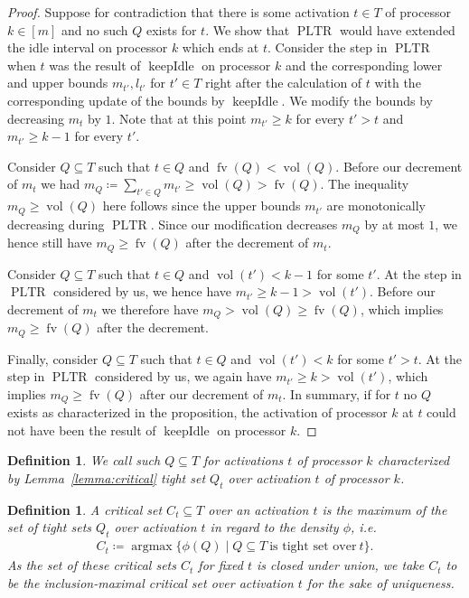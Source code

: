 \documentclass[a4paper]{article}
\DeclareMathOperator{\argmax}{argmax}
\DeclareMathOperator{\PLTR}{PLTR}
\DeclareMathOperator{\fv}{fv}
\DeclareMathOperator{\vol}{vol}
\DeclareMathOperator{\keepidle}{keepIdle}
\newtheorem{definition}[theorem]{Definition}
\begin{document}
\begin{proof}
  Suppose for contradiction that there is some activation $t \in T$ of processor $k \in [m]$ and no such $Q$ exists for $t$.
  We show that $\PLTR$ would have extended the idle interval on processor $k$ which ends at $t$.
  Consider the step in $\PLTR$ when $t$ was the result of $\keepidle$ on processor $k$ and the corresponding lower and upper bounds $m_{t'}, l_{t'}$ for $t' \in T$ right after the calculation of $t$ with the corresponding update of the bounds by $\keepidle$.
  We modify the bounds by decreasing $m_t$ by $1$.
  Note that at this point $m_{t'} \geq k$ for every $t' > t$ and $m_{t'} \geq k - 1$ for every $t'$.

  Consider $Q \subseteq T$ such that $t \in Q$ and $\fv(Q) < \vol(Q)$.
  Before our decrement of $m_t$ we had $m_Q \coloneqq \sum_{t' \in Q} m_{t'} \geq \vol(Q) > \fv(Q)$.
  The inequality $m_Q \geq \vol(Q)$ here follows since the upper bounds $m_{t'}$ are monotonically decreasing during $\PLTR$.
  Since our modification decreases $m_Q$ by at most $1$, we hence still have $m_Q \geq \fv(Q)$ after the decrement of $m_t$.

  Consider $Q \subseteq T$ such that $t \in Q$ and $\vol(t') < k - 1$ for some $t'$.
  At the step in $\PLTR$ considered by us, we hence have $m_{t'} \geq k - 1 > \vol(t')$.
  Before our decrement of $m_t$ we therefore have $m_Q > \vol(Q) \geq \fv(Q)$, which implies $m_Q \geq \fv(Q)$ after the decrement.

  Finally, consider $Q \subseteq T$ such that $t \in Q$ and $\vol(t') < k$ for some $t' > t$.
  At the step in $\PLTR$ considered by us, we again have $m_{t'} \geq k > \vol(t')$, which implies $m_Q \geq \fv(Q)$ after our decrement of $m_t$.
  In summary, if for $t$ no $Q$ exists as characterized in the proposition, the activation of processor $k$ at $t$ could not have been the result of $\keepidle$ on processor $k$.
\end{proof}

\begin{definition}
  We call such $Q \subseteq T$ for activations $t$ of processor $k$ characterized by Lemma~\ref{lemma:critical} \emph{tight set $Q_t$ over activation $t$ of processor $k$}.
\end{definition}

\begin{definition}
  A \emph{critical set $C_t \subseteq T$ over an activation $t$} is the maximum of the set of tight sets $Q_t$ over activation $t$ in regard to the density $\phi$, i.e.
  \begin{align}
    C_t \coloneqq \argmax \{ \phi(Q) \mid Q \subseteq T~\text{is tight set over}~t \} \text{.}
  \end{align}
  As the set of these critical sets $C_t$ for fixed $t$ is closed under union, we take $C_t$ to be the inclusion-maximal critical set over activation $t$ for the sake of uniqueness.
\end{definition}
\end{document}
